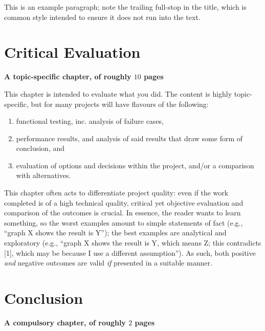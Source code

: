 \documentclass[ %
                    author={Luke Murray},
                supervisor={Dr. Simon Hollis},
                     title={Shadow Peer-to-Peer Networks},
                  subtitle={},
                    degree={MEng},
                      year={2013} ]{thesis}
\begin{document}
This is an example paragraph; note the trailing full-stop in the title,
which is common style intended to ensure it does not run into the text.


\chapter{Critical Evaluation}
\label{chap:evaluation}

{\bf A topic-specific chapter, of roughly $10$ pages} 
\vspace{1cm} 

\noindent
This chapter is intended to evaluate what you did.  The content is highly 
topic-specific, but for many projects will have flavours of the following:

\begin{enumerate}
\item functional testing, inc. analysis of failure cases,
\item performance results, and analysis of said results that draw some 
      form of conclusion,
      and
\item evaluation of options and decisions within the project, and/or a
      comparison with alternatives.
\end{enumerate}

\noindent
This chapter often acts to differentiate project quality: even if the work
completed is of a high technical quality, critical yet objective evaluation 
and comparison of the outcomes is crucial.  In essence, the reader wants to
learn something, so the worst examples amount to simple statements of fact 
(e.g., ``graph X shows the result is Y''); the best examples are analytical 
and exploratory (e.g., ``graph X shows the result is Y, which means Z; this 
contradicts [1], which may be because I use a different assumption'').  As 
such, both positive {\em and} negative outcomes are valid {\em if} presented 
in a suitable manner.


\chapter{Conclusion}
\label{chap:conclusion}

{\bf A compulsory chapter, of roughly $2$ pages} 
\vspace{1cm} 
\end{document}
